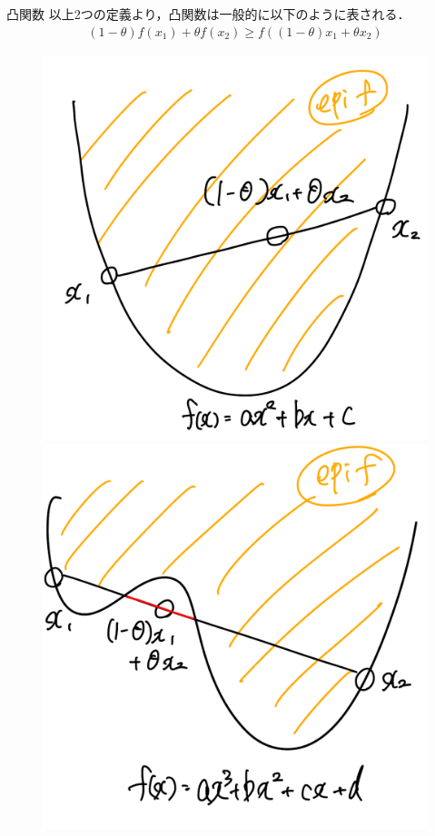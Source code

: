 \documentclass[aspectratio=169, dvipdfmx, 10.5pt]{beamer} %
\begin{document}
\begin{frame}{凸関数}
    以上2つの定義より，凸関数は一般的に以下のように表される．
    \begin{align}
        (1 - \theta)f(x_1) + \theta f(x_2) \geq f \left( (1 - \theta)x_1 + \theta x_2 \right)
    \end{align}
    \begin{figure}[htbp]
		\begin{minipage}[b]{0.45\textwidth}
			\centering
			\includegraphics[keepaspectratio, scale=0.12]{convex_function.png}
		\end{minipage}
		\begin{minipage}[b]{0.45\textwidth}
			\centering
			\includegraphics[keepaspectratio, scale=0.12]{non-convex_function.png}

\end{minipage}
\end{figure}
\end{frame}
\end{document}
